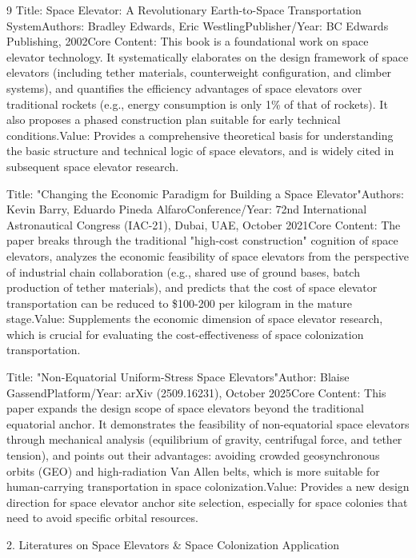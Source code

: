 \begin{ReportAiUse}{9}
Title: Space Elevator: A Revolutionary Earth-to-Space Transportation SystemAuthors: Bradley Edwards, Eric WestlingPublisher/Year: BC Edwards Publishing, 2002Core Content: This book is a foundational work on space elevator technology. It systematically elaborates on the design framework of space elevators (including tether materials, counterweight configuration, and climber systems), and quantifies the efficiency advantages of space elevators over traditional rockets (e.g., energy consumption is only 1\% of that of rockets). It also proposes a phased construction plan suitable for early technical conditions.Value: Provides a comprehensive theoretical basis for understanding the basic structure and technical logic of space elevators, and is widely cited in subsequent space elevator research.


Title: "Changing the Economic Paradigm for Building a Space Elevator"Authors: Kevin Barry, Eduardo Pineda AlfaroConference/Year: 72nd International Astronautical Congress (IAC-21), Dubai, UAE, October 2021Core Content: The paper breaks through the traditional "high-cost construction" cognition of space elevators, analyzes the economic feasibility of space elevators from the perspective of industrial chain collaboration (e.g., shared use of ground bases, batch production of tether materials), and predicts that the cost of space elevator transportation can be reduced to \$100-200 per kilogram in the mature stage.Value: Supplements the economic dimension of space elevator research, which is crucial for evaluating the cost-effectiveness of space colonization transportation.


Title: "Non-Equatorial Uniform-Stress Space Elevators"Author: Blaise GassendPlatform/Year: arXiv (2509.16231), October 2025Core Content: This paper expands the design scope of space elevators beyond the traditional equatorial anchor. It demonstrates the feasibility of non-equatorial space elevators through mechanical analysis (equilibrium of gravity, centrifugal force, and tether tension), and points out their advantages: avoiding crowded geosynchronous orbits (GEO) and high-radiation Van Allen belts, which is more suitable for human-carrying transportation in space colonization.Value: Provides a new design direction for space elevator anchor site selection, especially for space colonies that need to avoid specific orbital resources.

2. Literatures on Space Elevators & Space Colonization Application


\end{ReportAiUse}
